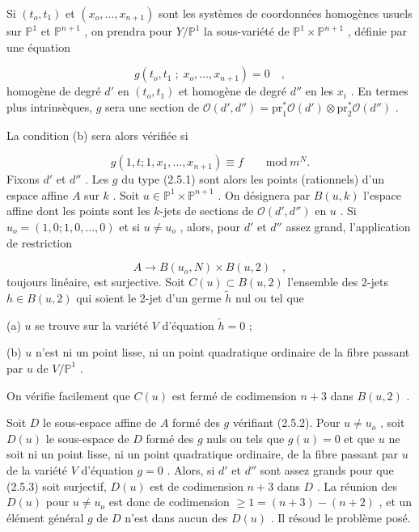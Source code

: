 Si $(t_o,t_1)$ et $(x_o,\ldots,x_{n+1})$ sont les systèmes de coordonnées homogènes usuels sur $\mathbb{P}^1$ et $\mathbb{P}^{n+1}$ , on prendra pour $Y/\mathbb{P}^1$ la sous-variété de $\mathbb{P}^1 \times \mathbb{P}^{n+1}$ , définie par une équation

\begin{equation}\tag{2.5.1}
g(t_o,t_1 \; ; \; x_o,\ldots,x_{n+1}) = 0 \quad ,
\end{equation}
homogène de degré $d'$ en $(t_o,t_1)$ et homogène de degré $d''$ en les $x_i$ . En termes plus intrinsèques, $g$ sera une section de $\mathcal{O}(d',d'') = \mathrm{pr}_1^{*} \mathcal{O}(d') \otimes \mathrm{pr}_2^{*} \mathcal{O}(d'')$ .



La condition (b) sera alors vérifiée si

\begin{equation}\tag{2.5.2}
g(1,t ; 1,x_1,\ldots,x_{n+1}) \equiv f \qquad \mathrm{mod}\ m^N .
\end{equation}
Fixons $d'$ et $d''$ . Les $g$ du type (2.5.1) sont alors les points (rationnels) d'un espace affine $A$ sur $k$ . Soit $u \in \mathbb{P}^1 \times \mathbb{P}^{n+1}$ . On désignera par $B(u,k)$ l'espace affine dont les points sont les $k$-jets de sections de $\mathcal{O}(d',d'')$ en $u$ . Si $u_o = (1,0;1,0,\ldots,0)$ et si $u \neq u_o$ , alors, pour $d'$ et $d''$ assez grand, l'application de restriction

\begin{equation}\tag{2.5.3}
A \to B(u_o,N) \times B(u,2) \quad ,
\end{equation}
toujours linéaire, est surjective. Soit $C(u) \subset B(u,2)$ l'ensemble des 2-jets $h \in B(u,2)$ qui soient le 2-jet d'un germe $\tilde{h}$ nul ou tel que

(a) $u$ se trouve sur la variété $V$ d'équation $\tilde{h} = 0$ ;

(b) $u$ n'est ni un point lisse, ni un point quadratique ordinaire de la fibre passant par $u$ de $V/\mathbb{P}^1$ .

On vérifie facilement que $C(u)$ est fermé de codimension $n + 3$ dans $B(u,2)$ .

Soit $D$ le sous-espace affine de $A$ formé des $g$ vérifiant (2.5.2). Pour $u \neq u_o$ , soit $D(u)$ le sous-espace de $D$ formé des $g$ nuls ou tels que $g(u) = 0$ et que $u$ ne soit ni un point lisse, ni un point quadratique ordinaire, de la fibre passant par $u$ de la variété $V$ d'équation $g = 0$ . Alors, si $d'$ et $d''$ sont assez grands pour que (2.5.3) soit surjectif, $D(u)$ est de codimension $n+3$ dans $D$ . La réunion des $D(u)$ pour $u \neq u_o$ est donc de codimension $\geq 1 = (n+3) - (n+2)$ , et un élément général $g$ de $D$ n'est dans aucun des $D(u)$ . Il résoud le problème posé.


